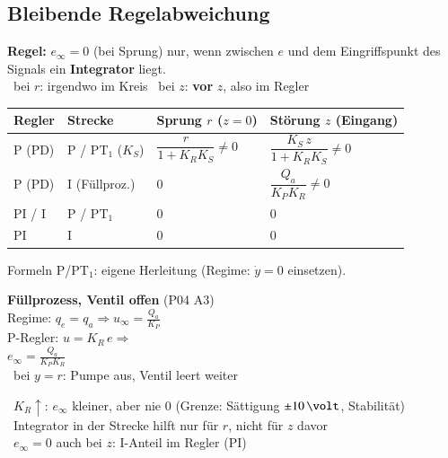 \subsection{Bleibende Regelabweichung}

\textbf{Regel:} $e_\infty = 0$ (bei Sprung) nur, wenn zwischen $e$ und dem Eingriffspunkt des Signals ein \textbf{Integrator} liegt. \\
{\small \textrightarrow\ bei $r$: irgendwo im Kreis \quad \textrightarrow\ bei $z$: \textbf{vor} $z$, also im Regler}

\vspace{0.15cm}
\begingroup
\small
\renewcommand{\arraystretch}{1.3}
\begin{tabularx}{\columnwidth}{@{}llXX@{}}
	\toprule
	\textbf{Regler} & \textbf{Strecke} & \textbf{Sprung $r$} ($z=0$) & \textbf{Störung $z$} (Eingang) \\
	\midrule
	P (PD) & P / $\text{PT}_1$ ($K_S$) & $\dfrac{r}{1+K_R K_S} \neq 0$ & $\dfrac{K_S\,z}{1+K_R K_S} \neq 0$ \\
	P (PD) & I (Füllproz.) & $0$ & $\dfrac{Q_a}{K_P K_R} \neq 0$ \\
	PI / I & P / $\text{PT}_1$ & $0$ & $0$ \\
	PI     & I & $0$ & $0$ \\
	\bottomrule
\end{tabularx}
\endgroup

{\scriptsize Formeln P/$\text{PT}_1$: eigene Herleitung (Regime: $\dot y = 0$ einsetzen).}

\vspace{0.15cm}
\begin{minipage}[c]{0.5\columnwidth}
	
\end{minipage}
\hfill
\begin{minipage}[c]{0.47\columnwidth}
	\small
	\textbf{Füllprozess, Ventil offen} (P04 A3) \\
	Regime: $q_e = q_a \Rightarrow u_\infty = \frac{Q_a}{K_P}$ \\
	P-Regler: $u = K_R\,e \Rightarrow$ \\
	$\boxed{e_\infty = \frac{Q_a}{K_P K_R}}$ \\[2pt]
	{\small \textrightarrow\ bei $y = r$: Pumpe aus, Ventil leert weiter}
\end{minipage}

\vspace{0.1cm}
{\small \textrightarrow\ $K_R \uparrow$: $e_\infty$ kleiner, aber nie $0$ (Grenze: Sättigung $\pm 10\,\volt$, Stabilität) \\
\textrightarrow\ Integrator in der Strecke hilft nur für $r$, nicht für $z$ davor \\
\textrightarrow\ $e_\infty = 0$ auch bei $z$: I-Anteil im Regler (PI)}



